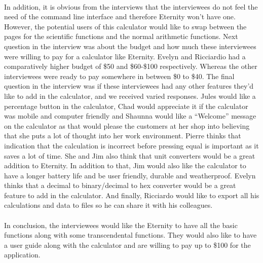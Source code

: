     \paragraph{}
    In addition, it is obvious from the interviews that the interviewees do not feel the need of the command line interface and therefore Eternity won’t have one. However, the potential users of this calculator would like to swap between the pages for the scientific functions and the normal arithmetic functions. Next question in the interview was about the budget and how much these interviewees were willing to pay for a calculator like Eternity. Evelyn and Ricciardio had a comparatively higher budget of \$50 and \$60-\$100 respectively. Whereas the other interviewees were ready to pay somewhere in between \$0 to \$40. The final question in the interview was if these interviewees had any other features they’d like to add in the calculator, and we received varied responses. Jules would like a percentage button in the calculator, Chad would appreciate it if the calculator was mobile and computer friendly and Shaunna would like a “Welcome” message on the calculator as that would please the customers at her shop into believing that she puts a lot of thought into her work environment. Pierre thinks that indication that the calculation is incorrect before pressing equal is important as it saves a lot of time. She and Jim also think that unit converters would be a great addition to Eternity. In addition to that, Jim would also like the calculator to have a longer battery life and be user friendly, durable and weatherproof. Evelyn thinks that a decimal to binary/decimal to hex converter would be a great feature to add in the calculator. And finally, Ricciardo would like to export all his calculations and data to files so he can share it with his colleagues.
    
    \paragraph{}
    In conclusion, the interviewees would like the Eternity to have all the basic functions along with some transcendental functions. They would also like to have a user guide along with the calculator and are willing to pay up to \$100 for the application.
    
    
    
